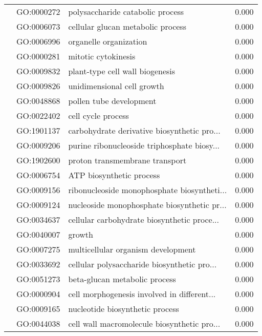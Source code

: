 \begin{longtable}{lllr}
   & GO:0000272 &             polysaccharide catabolic process &         0.000 \\
   & GO:0006073 &            cellular glucan metabolic process &         0.000 \\
   & GO:0006996 &                       organelle organization &         0.000 \\
   & GO:0000281 &                          mitotic cytokinesis &         0.000 \\
   & GO:0009832 &              plant-type cell wall biogenesis &         0.000 \\
   & GO:0009826 &                   unidimensional cell growth &         0.000 \\
   & GO:0048868 &                      pollen tube development &         0.000 \\
   & GO:0022402 &                           cell cycle process &         0.000 \\
   & GO:1901137 &  carbohydrate derivative biosynthetic pro... &         0.000 \\
   & GO:0009206 &  purine ribonucleoside triphosphate biosy... &         0.000 \\
   & GO:1902600 &               proton transmembrane transport &         0.000 \\
   & GO:0006754 &                     ATP biosynthetic process &         0.000 \\
   & GO:0009156 &  ribonucleoside monophosphate biosyntheti... &         0.000 \\
   & GO:0009124 &  nucleoside monophosphate biosynthetic pr... &         0.000 \\
   & GO:0034637 &  cellular carbohydrate biosynthetic proce... &         0.000 \\
   & GO:0040007 &                                       growth &         0.000 \\
   & GO:0007275 &           multicellular organism development &         0.000 \\
   & GO:0033692 &  cellular polysaccharide biosynthetic pro... &         0.000 \\
   & GO:0051273 &                beta-glucan metabolic process &         0.000 \\
   & GO:0000904 &  cell morphogenesis involved in different... &         0.000 \\
   & GO:0009165 &              nucleotide biosynthetic process &         0.000 \\
   & GO:0044038 &  cell wall macromolecule biosynthetic pro... &         0.000 \\

\end{longtable}
